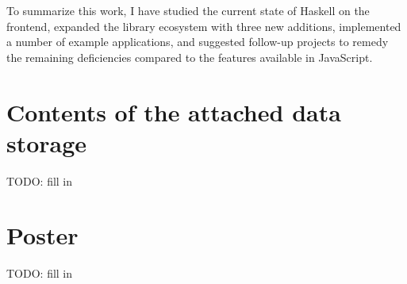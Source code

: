 \documentclass[english,odsaz]{fitthesis}
\begin{document}
To summarize this work, I have studied the current state of Haskell on the
frontend, expanded the library ecosystem with three new additions, implemented a
number of example applications, and suggested follow-up projects to remedy the
remaining deficiencies compared to the features available in JavaScript.

\makeatletter
\def\@openbib@code{\addcontentsline{toc}{chapter}{Bibliography}}
\makeatother


\begin{flushleft}

\end{flushleft}
\iftwoside\cleardoublepage\fi

\appendix
\appendixpage
\iftwoside\cleardoublepage\fi

\startcontents[chapters]
\iftwoside\cleardoublepage\fi

\chapter{Contents of the attached data storage}
\label{sec:orgba59ad8}
TODO: fill in

\chapter{Poster}
\label{sec:orgeda73aa}
TODO: fill in
\end{document}
